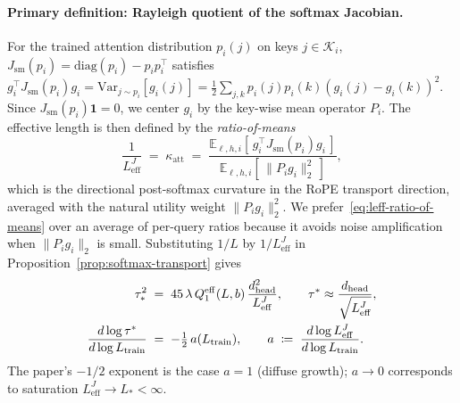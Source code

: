 \paragraph{Primary definition: Rayleigh quotient of the softmax Jacobian.}
For the trained attention distribution $p_i(j)$ on keys $j\!\in\!\mathcal{K}_i$, $J_{\mathrm{sm}}(p_i) = \mathrm{diag}(p_i) - p_ip_i^\top$ satisfies
$g_i^\top J_{\mathrm{sm}}(p_i) g_i = \mathrm{Var}_{j\sim p_i}[g_i(j)] = \tfrac{1}{2}\sum_{j,k} p_i(j)p_i(k)(g_i(j)-g_i(k))^2.$
Since $J_{\mathrm{sm}}(p_i)\mathbf{1}{=}0$, we center $g_i$ by the key-wise mean operator $P_i$. The effective length is then defined by the \emph{ratio-of-means}
\begin{equation}
\frac{1}{L_{\mathrm{eff}}^{J}} \;=\; \kappa_{\mathrm{att}} \;=\; \frac{\mathbb{E}_{\ell,h,i}\!\left[\,g_i^\top J_{\mathrm{sm}}(p_i)g_i\,\right]}{\mathbb{E}_{\ell,h,i}\!\left[\,\|P_i g_i\|_2^2\,\right]},
\label{eq:leff-ratio-of-means}
\end{equation}
which is the directional post-softmax curvature in the RoPE transport direction, averaged with the natural utility weight $\|P_ig_i\|_2^2$. We prefer~\eqref{eq:leff-ratio-of-means} over an average of per-query ratios because it avoids noise amplification when $\|P_ig_i\|_2$ is small. Substituting $1/L$ by $1/L_{\mathrm{eff}}^{J}$ in Proposition~\ref{prop:softmax-transport} gives
\begin{align}
\tau_*^2 \;&=\; 45\,\lambda\,Q_1^{\mathrm{eff}}(L,b)\,\frac{d_{\mathrm{head}}^2}{L_{\mathrm{eff}}^{J}}, \qquad \tau^{*}\approx \frac{d_{\mathrm{head}}}{\sqrt{L_{\mathrm{eff}}^{J}}}, \notag\\
\frac{d\log\tau^{*}}{d\log L_{\mathrm{train}}}\;&=\;-\tfrac{1}{2}\,a(L_{\mathrm{train}}), \qquad a\;\coloneqq\;\frac{d\log L_{\mathrm{eff}}^{J}}{d\log L_{\mathrm{train}}}.
\label{eq:tau-leff}
\end{align}
The paper's $-1/2$ exponent is the case $a{=}1$ (diffuse growth); $a{\to}0$ corresponds to saturation $L_{\mathrm{eff}}^{J}\!\to\!L_*{<}\infty$.

